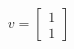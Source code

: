 \documentclass[preview]{standalone}
\begin{document}
\begin{align*}
v = \begin{bmatrix} 1 \\ 1 \end{bmatrix}
\end{align*}
\end{document}
